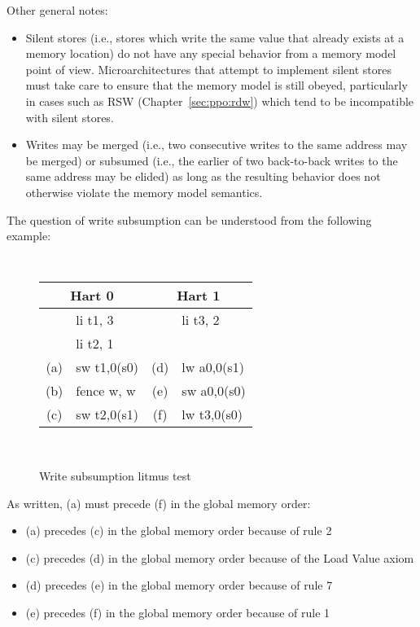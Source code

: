 Other general notes:

\begin{itemize}
  \item Silent stores (i.e., stores which write the same value that already exists at a memory location) do not have any special behavior from a memory model point of view.  Microarchitectures that attempt to implement silent stores must take care to ensure that the memory model is still obeyed, particularly in cases such as RSW (Chapter~\ref{sec:ppo:rdw}) which tend to be incompatible with silent stores.
  \item Writes may be merged (i.e., two consecutive writes to the same address may be merged) or subsumed (i.e., the earlier of two back-to-back writes to the same address may be elided) as long as the resulting behavior does not otherwise violate the memory model semantics.
\end{itemize}

The question of write subsumption can be understood from the following example:
\begin{figure}[h!]
  \centering
  {
    \tt\small
    \begin{tabular}{cl||cl}
    \multicolumn{2}{c}{Hart 0} & \multicolumn{2}{c}{Hart 1} \\
    \hline
        & li t1, 3    &     & li  t3, 2    \\
        & li t2, 1    &     &              \\
    (a) & sw t1,0(s0) & (d) & lw  a0,0(s1) \\
    (b) & fence w, w  & (e) & sw  a0,0(s0) \\
    (c) & sw t2,0(s1) & (f) & lw  t3,0(s0) \\
    \end{tabular}
  }
  ~~~~
  \diagram
  \caption{Write subsumption litmus test}
  \label{fig:litmus:subsumption}
\end{figure}

As written, (a) must precede (f) in the global memory order:
\begin{itemize}
  \item (a) precedes (c) in the global memory order because of rule 2
  \item (c) precedes (d) in the global memory order because of the Load Value axiom
  \item (d) precedes (e) in the global memory order because of rule 7
  \item (e) precedes (f) in the global memory order because of rule 1
\end{itemize}

